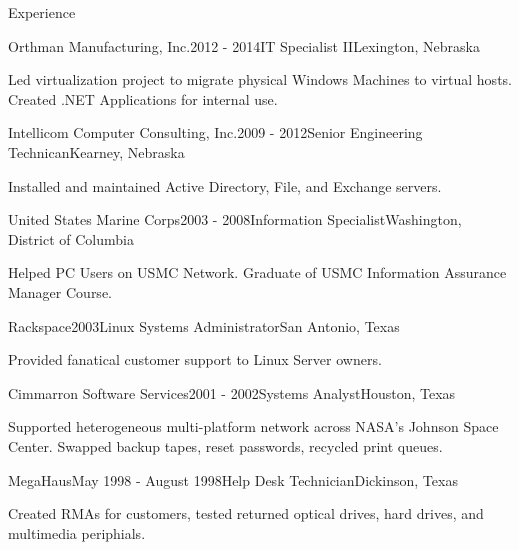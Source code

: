 \documentclass{resume} %
\begin{document}
\begin{rSection}{Experience}
\begin{rSubsection}{Orthman Manufacturing, Inc.}{2012 - 2014}{IT Specialist II}{Lexington, Nebraska}
\item Led virtualization project to migrate physical Windows Machines to virtual hosts. Created .NET Applications for internal use.
\end{rSubsection}

\begin{rSubsection}{Intellicom Computer Consulting, Inc.}{2009 - 2012}{Senior Engineering Technican}{Kearney, Nebraska}
\item Installed and maintained Active Directory, File, and Exchange servers. 
\end{rSubsection}

\begin{rSubsection}{United States Marine Corps}{2003 - 2008}{Information Specialist}{Washington, District of Columbia}
\item Helped PC Users on USMC Network. Graduate of USMC Information Assurance Manager Course.
\end{rSubsection}

\begin{rSubsection}{Rackspace}{2003}{Linux Systems Administrator}{San Antonio, Texas}
\item Provided fanatical customer support to Linux Server owners.
\end{rSubsection}

\begin{rSubsection}{Cimmarron Software Services}{2001 - 2002}{Systems Analyst}{Houston, Texas}
\item Supported heterogeneous multi-platform network across NASA's Johnson Space Center. Swapped backup tapes, reset passwords, recycled print queues.
\end{rSubsection}

\begin{rSubsection}{MegaHaus}{May 1998 - August 1998}{Help Desk Technician}{Dickinson, Texas}
\item Created RMAs for customers, tested returned optical drives, hard drives, and multimedia periphials.
\end{rSubsection}

\end{rSection}

\end{document}

